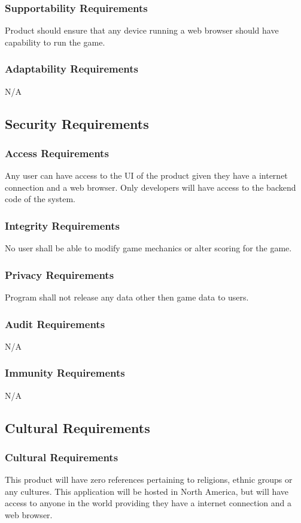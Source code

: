\documentclass[12pt, titlepage]{article}
\begin{document}
\subsubsection{Supportability Requirements}
Product should ensure that any device running a web browser should have capability to run the game.
\subsubsection{Adaptability Requirements}
N/A

\subsection{Security Requirements}
\subsubsection{Access Requirements}
Any user can have access to the UI of the product given they have a internet connection and a web browser. Only developers will have access to the backend code of the system.
\subsubsection{Integrity Requirements}
No user shall be able to modify game mechanics or alter scoring for the game.
\subsubsection{Privacy Requirements}
Program shall not release any data other then game data to users.
\subsubsection{Audit Requirements}
N/A
\subsubsection{Immunity Requirements}
N/A


\subsection{Cultural Requirements}
\subsubsection{Cultural Requirements}
This product will have zero references pertaining to religions, ethnic groups or any cultures. This application will be hosted in North America, but will have access to anyone in the world providing they have a internet connection and a web browser.
\end{document}
